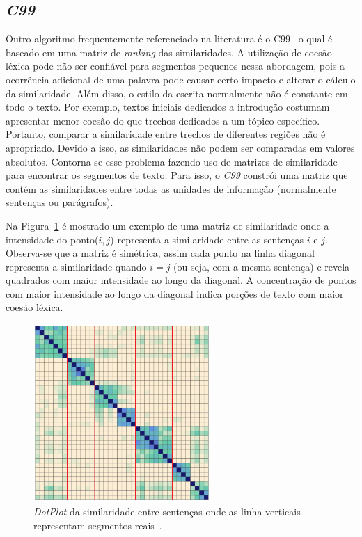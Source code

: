 \subsection*{\textit{C99}}
Outro algoritmo frequentemente referenciado na literatura é o C99~\cite{Choic99} o qual é baseado em uma matriz de \textit{ranking} das similaridades. A utilização de coesão léxica pode não ser confiável para segmentos pequenos nessa abordagem, pois a ocorrência adicional de uma palavra pode causar certo impacto e alterar o cálculo da similaridade. Além disso, o estilo da escrita normalmente não é constante em todo o texto. Por exemplo, textos iniciais dedicados a introdução costumam apresentar menor coesão do que trechos dedicados a um tópico específico. Portanto, comparar a similaridade entre trechos de diferentes regiões não é apropriado. Devido a isso, as similaridades não podem ser comparadas em valores absolutos. Contorna-se esse problema fazendo uso de matrizes de similaridade para encontrar os segmentos de texto. Para isso, o \textit{C99} constrói uma matriz que contém as similaridades entre todas as unidades de informação (normalmente sentenças ou parágrafos). 


Na Figura~\ref{fig:matrix-similarity} é mostrado um exemplo de uma matriz de similaridade onde a intensidade do ponto($i,j$) representa a similaridade entre as sentenças $i$ e $j$. Observa-se que a matriz é simétrica, assim cada ponto na linha diagonal representa a similaridade quando $i = j$ (ou seja, com a mesma sentença) e revela quadrados com maior intensidade ao longo da diagonal. A concentração de pontos com maior intensidade ao longo da diagonal indica porções de texto com maior coesão léxica.


  \begin{figure}[!h]
	  \centering
	  \includegraphics[width=0.6\textwidth]{conteudo/capitulos/figs/similarity-matrix-c99.png}

	  \caption{\textit{DotPlot} da similaridade entre sentenças onde as linha verticais representam segmentos reais~\cite{Eis2008}.}
	  \label{fig:matrix-similarity}
  \end{figure}



